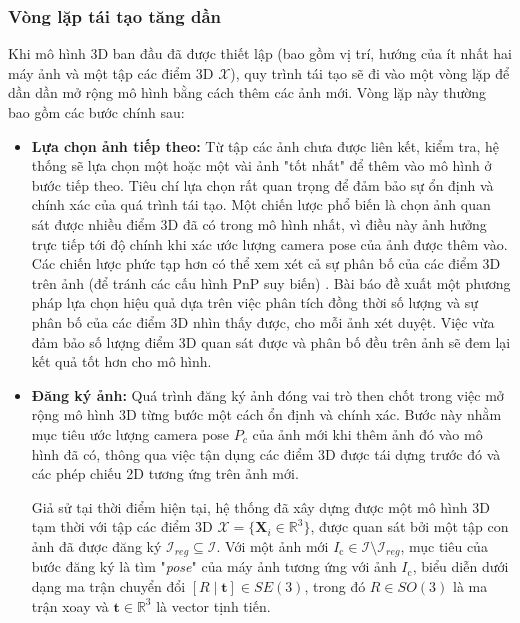 \subsubsection{Vòng lặp tái tạo tăng dần}
Khi mô hình 3D ban đầu đã được thiết lập (bao gồm vị trí, hướng của ít nhất hai máy ảnh và một tập các điểm 3D $\mathcal{X}$), quy trình tái tạo sẽ đi vào một vòng lặp để dần dần mở rộng mô hình bằng cách thêm các ảnh mới. Vòng lặp này thường bao gồm các bước chính sau:

\begin{itemize}
    \item \textbf{Lựa chọn ảnh tiếp theo:} Từ tập các ảnh chưa được liên kết, kiểm tra, hệ thống sẽ lựa chọn một hoặc một vài ảnh "tốt nhất" để thêm vào mô hình ở bước tiếp theo. Tiêu chí lựa chọn rất quan trọng để đảm bảo sự ổn định và chính xác của quá trình tái tạo. Một chiến lược phổ biến là chọn ảnh quan sát được nhiều điểm 3D đã có trong mô hình nhất, vì điều này ảnh hưởng trực tiếp tới độ chính khi xác ước lượng camera pose của ảnh được thêm vào. Các chiến lược phức tạp hơn có thể xem xét cả sự phân bố của các điểm 3D trên ảnh (để tránh các cấu hình PnP suy biến) \cite{Lepetit09EPnP}. Bài báo \cite{Schonberger16SFMRevisited} đề xuất một phương pháp lựa chọn hiệu quả dựa trên việc phân tích đồng thời số lượng và sự phân bố của các điểm 3D nhìn thấy được, cho mỗi ảnh xét duyệt. Việc vừa đảm bảo số lượng điểm 3D quan sát được và phân bố đều trên ảnh sẽ đem lại kết quả tốt hơn cho mô hình.

    \item \textbf{Đăng ký ảnh:} Quá trình đăng ký ảnh đóng vai trò then chốt trong việc mở rộng mô hình 3D từng bước một cách ổn định và chính xác. Bước này nhằm mục tiêu ước lượng camera pose $P_c$ của ảnh mới khi thêm ảnh đó vào mô hình đã có, thông qua việc tận dụng các điểm 3D được tái dựng trước đó và các phép chiếu 2D tương ứng trên ảnh mới.

    Giả sử tại thời điểm hiện tại, hệ thống đã xây dựng được một mô hình 3D tạm thời với tập các điểm 3D \( \mathcal{X} = \{ \mathbf{X}_i \in \mathbb{R}^3 \} \), được quan sát bởi một tập con ảnh đã được đăng ký \( \mathcal{I}_{reg} \subseteq \mathcal{I} \). Với một ảnh mới \( I_{\text{c}} \in \mathcal{I} \setminus \mathcal{I}_{reg} \), mục tiêu của bước đăng ký là tìm "\textit{pose}" của máy ảnh tương ứng với ảnh \( I_{\text{c}} \), biểu diễn dưới dạng ma trận chuyển đổi \( [R \mid \mathbf{t}] \in SE(3) \), trong đó \( R \in SO(3) \) là ma trận xoay và \( \mathbf{t} \in \mathbb{R}^3 \) là vector tịnh tiến.
    

\end{itemize}
